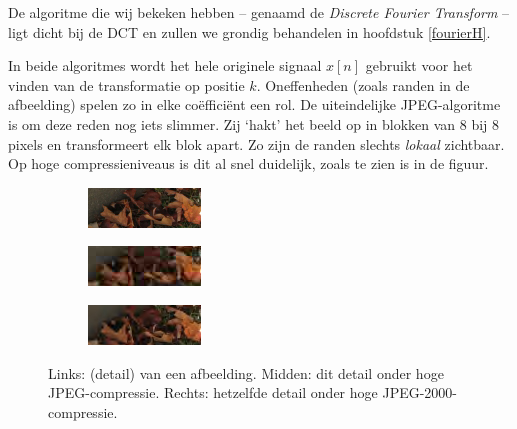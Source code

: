 \documentclass[11pt]{uvamath}
\theoremstyle{plain}
\theoremstyle{definition}
\theoremstyle{remark}
\begin{document}
De algoritme die wij bekeken hebben -- genaamd de \emph{Discrete Fourier Transform} -- ligt dicht bij de DCT en zullen we grondig behandelen in hoofdstuk \ref{fourierH}.

In beide algoritmes wordt het hele originele signaal $x[n]$ gebruikt voor het vinden van de transformatie op positie $k$. Oneffenheden (zoals randen in de afbeelding) spelen zo in elke co\"effici\"ent een rol. De uiteindelijke JPEG-algoritme is om deze reden nog iets slimmer. Zij `hakt' het beeld op in blokken van 8 bij 8 pixels en transformeert elk blok apart. Zo zijn de randen slechts \emph{lokaal} zichtbaar. Op hoge compressieniveaus is dit al snel duidelijk, zoals te zien is in de figuur.
\begin{figure}[h]
\label{duidelijk}
	\centering
	\begin{subfigure}{0.32\linewidth}
		\includegraphics[width=\linewidth]{plaatjes/jpeg_crop.jpg}
	\end{subfigure}
	\begin{subfigure}{0.32\linewidth}
		\includegraphics[width=\linewidth]{plaatjes/jpeg_jpeg_crop.jpg}
	\end{subfigure}
	\begin{subfigure}{0.32\linewidth}
		\includegraphics[width=\linewidth]{plaatjes/jpeg_jpeg2k_crop.jpg}
	\end{subfigure}
	\caption*{Links: (detail) van een afbeelding. Midden: dit detail onder hoge JPEG-compressie. Rechts: hetzelfde detail onder hoge JPEG-2000-compressie.}
\end{figure}
\end{document}

